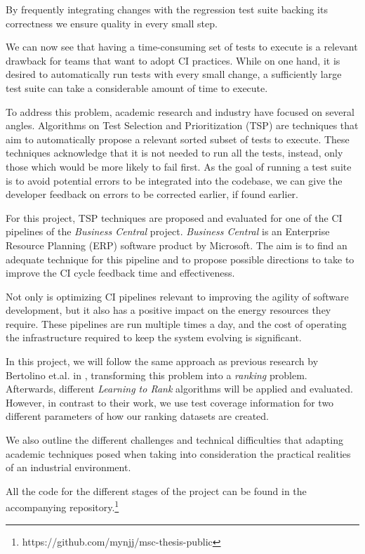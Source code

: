 By frequently integrating changes with the regression test suite backing its correctness
we ensure quality in every small step.

We can now see that having a time-consuming set of tests to execute is a relevant 
drawback for teams that want to adopt CI practices. While on one hand, it is desired
to automatically run tests with every small change, a sufficiently large test suite
can take a considerable amount of time to execute.

To address this problem, academic research and industry have focused on several angles.
Algorithms on Test Selection and Prioritization (TSP) are techniques that aim to 
automatically propose a relevant sorted subset of tests to execute. These techniques
acknowledge that it is not needed to run all the tests, instead, only
those which would be more likely to fail first. As the goal of running a test suite is to
avoid potential errors to be integrated into the codebase, we can give the developer 
feedback on errors to be corrected earlier, if found earlier.

For this project, TSP techniques are proposed and evaluated for one of the CI pipelines
of the \emph{Business Central} project. \emph{Business Central} is an Enterprise Resource Planning (ERP)
software product by Microsoft. The aim is to find an adequate technique
for this pipeline and to propose possible directions to take to improve the
CI cycle feedback time and effectiveness.

Not only is optimizing CI pipelines relevant to improving the agility of software development, 
but it also has a positive impact on the energy resources they require.
These pipelines are run multiple times a day, and the cost of operating the infrastructure
required to keep the system evolving is significant.

In this project, we will follow the same approach as previous research by Bertolino
et.al. in \cite{Bertolino2020LearningtoRankVR}, transforming this problem into a \emph{ranking} problem.
Afterwards, different \emph{Learning to Rank} algorithms will be applied and evaluated.
However, in contrast to their work, we use test coverage information for two different 
parameters of how our ranking datasets are created.

We also outline the different challenges and technical difficulties that adapting
academic techniques posed when taking into consideration the practical realities
of an industrial environment. 

All the code for the different stages of the project can be found 
in the accompanying repository.\footnote{https://github.com/mynjj/msc-thesis-public}